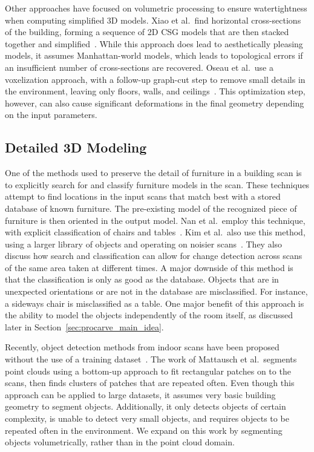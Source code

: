 \documentclass[12pt,onecolumn,oneside]{book}
\begin{document}
Other approaches have focused on volumetric processing to ensure watertightness when computing simplified 3D models.  Xiao et al.\ find horizontal cross-sections of the building, forming a sequence of 2D CSG models that are then stacked together and simplified~\cite{Museums}.  While this approach does lead to aesthetically pleasing models, it assumes Manhattan-world models, which leads to topological errors if an insufficient number of cross-sections are recovered.  Oseau et al.\ use a voxelization approach, with a follow-up graph-cut step to remove small details in the environment, leaving only floors, walls, and ceilings~\cite{Oesau13}.  This optimization step, however, can also cause significant deformations in the final geometry depending on the input parameters. 

\subsection{Detailed 3D Modeling}
\label{ssec:background_3dmodeling}

One of the methods used to preserve the detail of furniture in a building scan is to explicitly search for and classify furniture models in the scan.  These techniques attempt to find locations in the input scans that match best with a stored database of known furniture.  The pre-existing model of the recognized piece of furniture is then oriented in the output model.  Nan et al.\ employ this technique, with explicit classification of chairs and tables~\cite{SearchClassifyPointcloud}.  Kim et al.\ also use this method, using a larger library of objects and operating on noisier scans~\cite{Kim12}.  They also discuss how search and classification can allow for change detection across scans of the same area taken at different times.  A major downside of this method is that the classification is only as good as the database.  Objects that are in unexpected orientations or are not in the database are misclassified.  For instance, a sideways chair is misclassified as a table.  One major benefit of this approach is the ability to model the objects independently of the room itself, as discussed later in Section~\ref{sec:procarve_main_idea}.  

Recently, object detection methods from indoor scans have been proposed without the use of a training dataset~\cite{ObjectDiscovery13,Mattausch14}.  The work of Mattausch et al.\ segments point clouds using a bottom-up approach to fit rectangular patches on to the scans, then finds clusters of patches that are repeated often.  Even though this approach can be applied to large datasets, it assumes very basic building geometry to segment objects.  Additionally, it only detects objects of certain complexity, is unable to detect very small objects, and requires objects to be repeated often in the environment.  We expand on this work by segmenting objects volumetrically, rather than in the point cloud domain.
\end{document}
